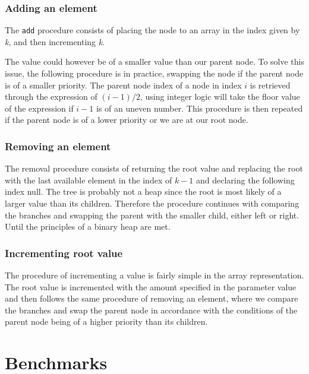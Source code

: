 \documentclass[a4paper,11pt]{article}
\begin{document}
        \subsubsection*{Adding an element}

            The \texttt{add} procedure consists of placing the node to an array in the index given by \textit{k}, and then incrementing \textit{k}. 
            
            The value could however be of a smaller value than our parent node. To solve this issue, the following procedure is in practice, swapping the node if the parent node is of a smaller priority. The parent node index of a node in index $i$ is retrieved through the expression of $(i-1)/2$, using integer logic will take the floor value of the expression if $i-1$ is of an uneven number. This procedure is then repeated if the parent node is of a lower priority or we are at our root node.

        \subsubsection*{Removing an element}

            The removal procedure consists of returning the root value and replacing the root with the last available element in the index of $k - 1$ and declaring the following index null. The tree is probably not a heap since the root is most likely of a larger value than its children. Therefore the procedure continues with comparing the branches and swapping the parent with the smaller child, either left or right. Until the principles of a binary heap are met.

        \subsubsection*{Incrementing root value}

            The procedure of incrementing a value is fairly simple in the array representation. The root value is incremented with the amount specified in the parameter value and then follows the same procedure of removing an element, where we compare the branches and swap the parent node in accordance with the conditions of the parent node being of a higher priority than its children.
        
\section*{Benchmarks}
\end{document}
